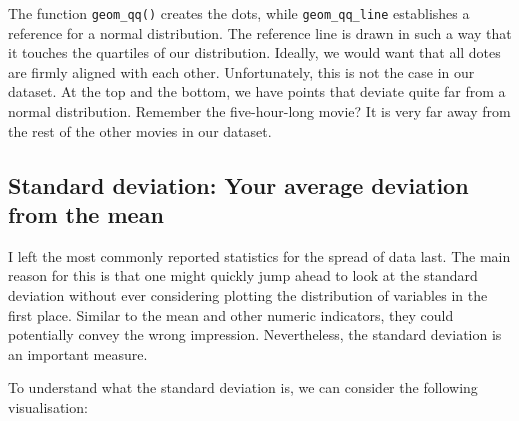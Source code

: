 \documentclass[
  letterpaper,
]{krantz}
\makeatletter
\newenvironment{Shaded}{\begin{snugshade}}{\end{snugshade}}
\newcommand{\AttributeTok}[1]{\textcolor[rgb]{0.40,0.45,0.13}{#1}}
\newcommand{\CommentTok}[1]{\textcolor[rgb]{0.37,0.37,0.37}{#1}}
\newcommand{\ConstantTok}[1]{\textcolor[rgb]{0.56,0.35,0.01}{#1}}
\newcommand{\FunctionTok}[1]{\textcolor[rgb]{0.28,0.35,0.67}{#1}}
\newcommand{\NormalTok}[1]{\textcolor[rgb]{0.00,0.23,0.31}{#1}}
\newcommand{\OtherTok}[1]{\textcolor[rgb]{0.00,0.23,0.31}{#1}}
\newcommand{\SpecialCharTok}[1]{\textcolor[rgb]{0.37,0.37,0.37}{#1}}
\newcommand{\StringTok}[1]{\textcolor[rgb]{0.13,0.47,0.30}{#1}}
\newenvironment{kframe}{%
\medskip{}
\setlength{\fboxsep}{.8em}
 \def\at@end@of@kframe{}%
 \ifinner\ifhmode%
  \def\at@end@of@kframe{\end{minipage}}%
  \begin{minipage}{\columnwidth}%
 \fi\fi%
 \def\FrameCommand##1{\hskip\@totalleftmargin \hskip-\fboxsep
 \colorbox{shadecolor}{##1}\hskip-\fboxsep
     \hskip-\linewidth \hskip-\@totalleftmargin \hskip\columnwidth}%
 \MakeFramed {\advance\hsize-\width
   \@totalleftmargin\z@ \linewidth\hsize
   \@setminipage}}%
 {\par\unskip\endMakeFramed%
 \at@end@of@kframe}
\renewenvironment{Shaded}{\begin{kframe}}{\end{kframe}}
\makeatother
\begin{document}
The function \texttt{geom\_qq()} creates the dots, while
\texttt{geom\_qq\_line} establishes a reference for a normal
distribution. The reference line is drawn in such a way that it touches
the quartiles of our distribution. Ideally, we would want that all dotes
are firmly aligned with each other. Unfortunately, this is not the case
in our dataset. At the top and the bottom, we have points that deviate
quite far from a normal distribution. Remember the five-hour-long movie?
It is very far away from the rest of the other movies in our dataset.

\subsection{Standard deviation: Your average deviation from the
mean}\label{standard-deviation}

I left the most commonly reported statistics for the spread of data
last. The main reason for this is that one might quickly jump ahead to
look at the standard deviation without ever considering plotting the
distribution of variables in the first place. Similar to the mean and
other numeric indicators, they could potentially convey the wrong
impression. Nevertheless, the standard deviation is an important
measure.

To understand what the standard deviation is, we can consider the
following visualisation:

\begin{Shaded}
\end{Shaded}
\end{document}
